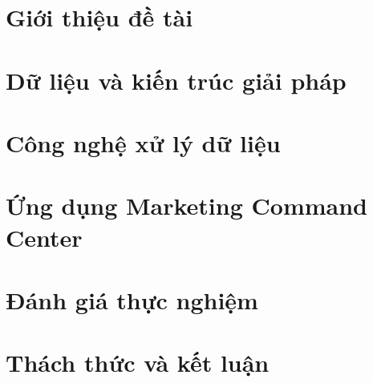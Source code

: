 \documentclass[12pt, a4paper]{report}
\theoremstyle{definition}
\DeclareRobustCommand{\_}{\textunderscore\allowbreak}
\begin{document}
\newpage

\tableofcontents
\listoffigures
\listoftables


\pagestyle{fancy}
\renewcommand{\chaptermark}[1]{\markboth{\MakeUppercase{#1}}{}}
\fancyhf{}
\fancyhead[LE,RO]{\leftmark}
\fancyhead[RE,LO]{}
\fancyfoot[LE,RO]{\thepage}
\renewcommand{\footrulewidth}{0.4pt}




\newpage
\chapter{Giới thiệu đề tài}
\label{chap:gioi-thieu}


\newpage
\chapter{Dữ liệu và kiến trúc giải pháp}
\label{chap:du-lieu-kien-truc}


\newpage
\chapter{Công nghệ xử lý dữ liệu}
\label{chap:cong-nghe}


\newpage
\chapter{Ứng dụng Marketing Command Center}
\label{chap:ung-dung}


\newpage
\chapter{Đánh giá thực nghiệm}
\label{chap:danh-gia}


\newpage
\chapter{Thách thức và kết luận}
\label{chap:ket-luan}



\newpage


\end{document}
